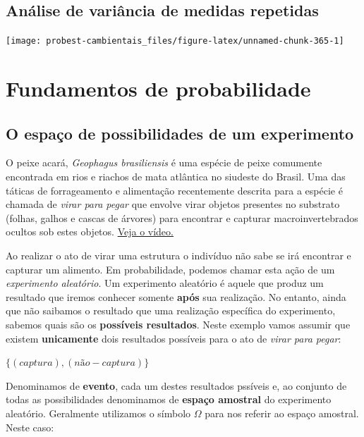 \documentclass[
]{book}
\begin{document}
\hypertarget{repanova}{%
\chapter{Análise de variância de medidas repetidas}\label{repanova}}

\begin{center}\texttt{[image: probest-cambientais\_files/figure-latex/unnamed-chunk-365-1]} \end{center}

\hypertarget{part-fundamentos-de-probabilidade}{%
\part{Fundamentos de probabilidade}\label{part-fundamentos-de-probabilidade}}

\hypertarget{espacoamostral}{%
\chapter{O espaço de possibilidades de um experimento}\label{espacoamostral}}

O peixe acará, \emph{Geophagus brasiliensis} é uma espécie de peixe comumente encontrada em rios e riachos de mata atlântica no siudeste do Brasil. Uma das táticas de forrageamento e alimentação recentemente descrita para a espécie é chamada de \emph{virar para pegar} \citep{souza2019surprising} que envolve virar objetos presentes no substrato (folhas, galhos e cascas de árvores) para encontrar e capturar macroinvertebrados ocultos sob estes objetos. \href{https://www.scielo.br/img/revistas/bn/v19n3/1676-0611-bn-19-03-e20180702-suppl1.mp4}{Veja o vídeo.}

Ao realizar o ato de virar uma estrutura o indivíduo não sabe se irá encontrar e capturar um alimento. Em probabilidade, podemos chamar esta ação de um \emph{experimento aleatório}. Um experimento aleatório é aquele que produz um resultado que iremos conhecer somente \textbf{após} sua realização. No entanto, ainda que não saibamos o resultado que uma realização específica do experimento, sabemos quais são os \textbf{possíveis resultados}. Neste exemplo vamos assumir que existem \textbf{unicamente} dois resultados possíveis para o ato de \emph{virar para pegar}:

\(\{(captura), (não-captura)\}\)

Denominamos de \textbf{evento}, cada um destes resultados pssíveis e, ao conjunto de todas as possibilidades denominamos de \textbf{espaço amostral} do experimento aleatório. Geralmente utilizamos o símbolo \(\Omega\) para nos referir ao espaço amostral. Neste caso:
\end{document}
